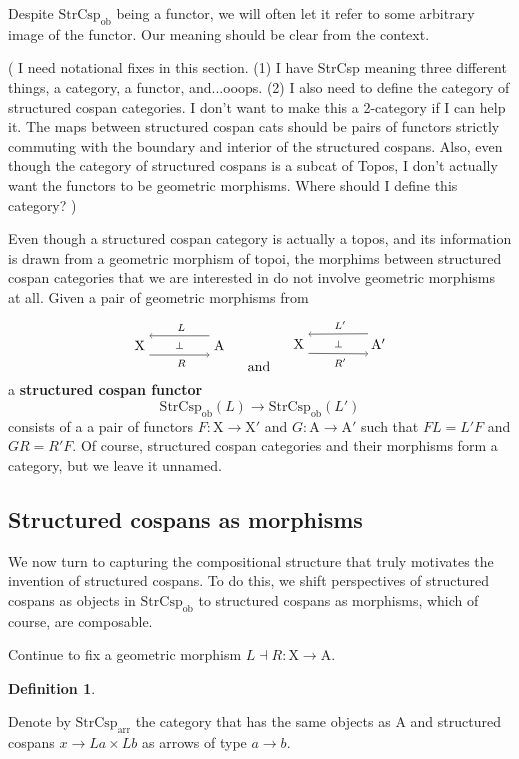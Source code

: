 \documentclass{amsart}
\newcommand{\ob}{_{ \text{ob} }}
\newcommand{\arr}{_{ \text{arr} }}
\newcommand{\A}{\cat{A}}
\newcommand{\X}{\cat{X}}
\newcommand{\StrCsp}{\cat{StrCsp}}
\newcommand{\defn}[1]{\textbf{#1}}
\newcommand{\cat}[1]{\mathrm{#1}}
\renewcommand{\t}[1]{\text{#1}}
\newcommand{\edit}[1]{\textcolor{editcolour}{(#1)}}
\newcommand{\from}{\colon}
\newcommand{\csp}[3]{#2 \to #1 \times #3}
\theoremstyle{remark}
\theoremstyle{definition}
\newtheorem{definition}[theorem]{Definition}
\newcommand{\adjunction}[4]{%
  \begin{tikzpicture}
    \node (1) at (0,0) {\( #1 \)};
    \node (2) at (2,0) {\( #4 \)};
    \node (3) at (1,0) {\scriptsize{\( \perp \)}};
    \draw [->] (2.135) to node [above] {\scriptsize{ $ #2 $ }} (1.45);
    \draw [->] (1.-45) to node [below] {\scriptsize{ $ #3 $ }} (2.-135);
  \end{tikzpicture}
%
}
\begin{document}
Despite $ \StrCsp\ob $ being a functor, we will often let it refer
to some arbitrary image of the functor. Our meaning should be clear
from the context.

\edit{%
  I need notational fixes in this section.  (1) I have StrCsp
  meaning three different things, a category, a functor,
  and...ooops. (2) I also need to define the category of structured
  cospan categories. I don't want to make this a 2-category if I can
  help it.  The maps between structured cospan cats should be pairs of
  functors strictly commuting with the boundary and interior of the
  structured cospans.  Also, even though the category of structured
  cospans is a subcat of Topos, I don't actually want the functors to
  be geometric morphisms.  Where should I define this category?
}

Even though a structured cospan category is actually a topos, and its
information is drawn from a geometric morphism of topoi, the morphims
between structured cospan categories that we are interested in do not
involve geometric morphisms at all. Given a pair of geometric morphisms from
%
\[
  \adjunction{\X}{L}{R}{\A}
  \quad
  \t{ and }
  \quad
  \adjunction{\X}{L'}{R'}{\A'}
\]
% 
a \defn{structured cospan functor}
%
\[
  \StrCsp\ob (L) \to \StrCsp\ob (L')
\]
% 
consists of a a pair of functors $ F \from \X \to \X' $ and $ G \from
\A \to \A' $ such that $ FL=L'F $ and $ GR = R'F $.  Of course,
structured cospan categories and their morphisms form a category, but
we leave it unnamed.


\subsection{Structured cospans as morphisms}
\label{sec:strcsp-as-arrows}

We now turn to capturing the compositional structure that
truly motivates the invention of structured cospans.  To do this, we
shift perspectives of structured cospans as objects in $ \StrCsp\ob $
to structured cospans as morphisms, which of course, are composable. 

Continue to fix a geometric morphism $ L \dashv R \from
\X \to \A $.

\begin{definition} \label{def:strcsp-arr}
  
  Denote by $ \StrCsp\arr $ the category that has the same objects as
  $ \A $ and structured cospans $ \csp{La}{x}{Lb} $ as arrows of
  type $ a \to b $.
  
\end{definition}
\end{document}
